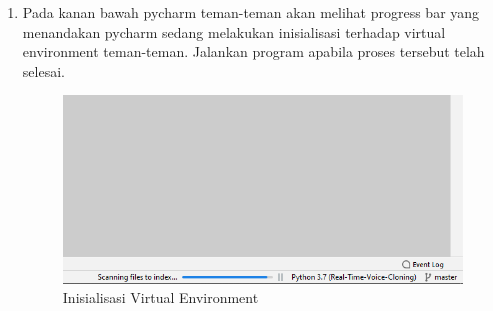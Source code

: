 \begin{enumerate}
\item Pada kanan bawah pycharm teman-teman akan melihat progress bar yang menandakan pycharm sedang melakukan inisialisasi terhadap virtual environment teman-teman. Jalankan program apabila proses tersebut telah selesai.
\begin{figure}[H]
\centering
\includegraphics[scale=.4]{figures/env7}
\caption{Inisialisasi Virtual Environment}
\label{env7}
\end{figure}

\end{enumerate}

